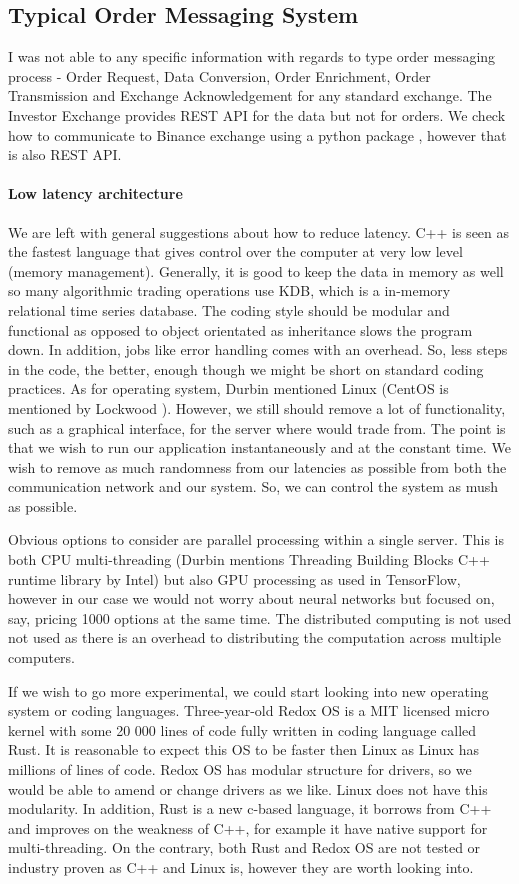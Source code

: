 \documentclass[12pt]{article}
\begin{document}
\subsection{Typical Order Messaging System}
I was not able to any specific information with regards to type order messaging process - Order Request, Data Conversion, Order Enrichment, Order Transmission and Exchange Acknowledgement for any standard exchange. The Investor Exchange provides REST API \cite{iex} for the data but not for orders. We check how to communicate to Binance exchange using a python package \cite{bapi}, however that is also REST API.

\paragraph*{Low latency architecture} We are left with general suggestions about how to reduce latency. C++ is seen as the fastest language that gives control over the computer at very low level (memory management). Generally, it is good to keep the data in memory as well so many algorithmic trading operations use KDB, which is a in-memory relational time series database. The coding style should be modular and functional as opposed to object orientated as inheritance slows the program down. In addition, jobs like error handling comes with an overhead. So, less steps in the code, the better, enough though we might be short on standard coding practices. As for operating system, Durbin \cite{durbin} mentioned Linux (CentOS is mentioned by Lockwood \cite{lockwood}). However, we still should remove a lot of  
functionality, such as a graphical interface, for the server where would trade from. The point is that we wish to run our application instantaneously and at the constant time. We wish to remove as much randomness from our latencies as possible from both the communication network and our system. So, we can control the system as mush as possible.

Obvious options to consider are parallel processing within a single server. This is both CPU multi-threading (Durbin \cite{durbin} mentions Threading Building Blocks C++ runtime library by Intel) but also GPU processing as used in TensorFlow, however in our case we would not worry about neural networks but focused on, say, pricing 1000 options at the same time. The distributed computing is not used not used as there is an overhead to distributing the computation across multiple computers.

If we wish to go more experimental, we could start looking into new operating system or coding languages. Three-year-old Redox OS is a  MIT licensed micro kernel with some 20 000 lines of code fully written in coding language called Rust. It is reasonable to expect this OS to be faster then Linux as Linux has millions of lines of code. Redox OS has modular structure for drivers, so we would be able to amend or change drivers as we like. Linux does not have this modularity. In addition, Rust is a new c-based language, it borrows from C++ and improves on the weakness of C++, for example it have native support for multi-threading. On the contrary, both Rust and Redox OS are not tested or industry proven as C++ and Linux is, however they are worth looking into.
\end{document}
